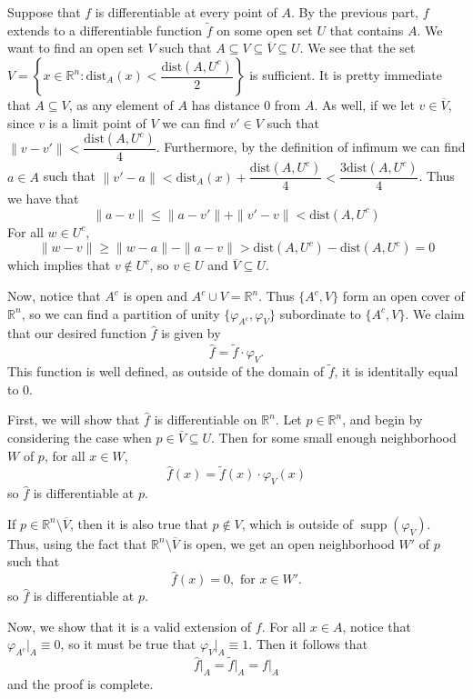\documentclass{article}
\newcommand{\cl}[1]{\overline{#1}}
\theoremstyle{plain} %
\numberwithin{thm}{section} %
\theoremstyle{definition}
\begin{document}
\begin{question}{36}
        Suppose that \(f\) is differentiable at every point of \(A\). By the previous part, \(f\) extends to a differentiable function \(\widetilde{f}\) on some open set \(U\) that contains \(A\). We want to find an open set \(V\) such that \(A \subseteq V \subseteq \cl{V} \subseteq U\). We see that the set \(V = \left\{ x \in \mathbb{R}^n : \mathrm{dist}_A (x) < \dfrac{\mathrm{dist}(A, U^c)}{2}\right\}\) is sufficient. It is pretty immediate that \(A \subseteq V\), as any element of \(A\) has distance 0 from \(A\). As well, if we let \(v \in \cl{V}\), since \(v\) is a limit point of \(V\) we can find \(v' \in V\) such that \(\|v - v'\| < \dfrac{\mathrm{dist}(A, U^c)}{4}\). Furthermore, by the definition of infimum we can find \(a \in A\) such that \(\|v' - a \| < \mathrm{dist}_A (x) +  \dfrac{\mathrm{dist}(A, U^c)}{4} < \dfrac{3\mathrm{dist}(A, U^c)}{4}\). Thus we have that
        \[
            \|a - v\| \leq \|a - v'\| + \|v' - v\| < \mathrm{dist}(A, U^c)
        \]
        For all \(w \in U^c\),
        \[
            \|w - v\| \geq \|w - a\| - \|a - v\| > \mathrm{dist}(A, U^c) - \mathrm{dist}(A, U^c) = 0
        \]
        which implies that \(v \notin U^c\), so \(v \in U\) and \(\cl{V} \subseteq U\).
        
        Now, notice that \(A^c\) is open and \(A^c \cup V = \mathbb{R}^n\). Thus \(\{ A^c, V \}\) form an open cover of \(\mathbb{R}^n\), so we can find a partition of unity \(\{\varphi_{A^c}, \varphi_{V}\}\) subordinate to \(\{ A^c, V \}\). We claim that our desired function \(\widehat{f}\) is given by
        \[
            \widehat{f} = \widetilde{f} \cdot \varphi_{V}.
        \]
        This function is well defined, as outside of the domain of \(\widetilde{f}\), it is identitally equal to 0.

        First, we will show that \(\widehat{f}\) is differentiable on \(\mathbb{R}^n\). Let \(p \in \mathbb{R}^n\), and begin by considering the case when \(p \in \cl{V} \subseteq U\). Then for some small enough neighborhood \(W\) of \(p\), for all \(x \in W\),
        \[
            \widehat{f}(x) = \widetilde{f} (x) \cdot \varphi_V (x)
        \]
        so \(\widehat{f}\) is differentiable at \(p\).

        If \(p \in \mathbb{R}^n \setminus \cl{V}\), then it is also true that \(p \notin V\), which is outside of \(\mathop{\mathrm{supp}}(\varphi_V)\). Thus, using the fact that \(\mathbb{R}^n \setminus \cl{V}\) is open, we get an open neighborhood \(W'\) of \(p\) such that
        \[
            \widehat{f}(x) = 0, \text{ for } x \in W'.
        \]
        so \(\widehat{f}\) is differentiable at \(p\).

        Now, we show that it is a valid extension of \(f\). For all \(x \in A\), notice that \(\varphi_{A^c} \vert _A \equiv 0\), so it must be true that \(\varphi _V \vert _A \equiv 1\). Then it follows that
        \[
            \widehat{f} \vert _A = \widetilde{f}\vert _A = f \vert _A
        \]
        and the proof is complete.
 \end{question}
\end{document}
